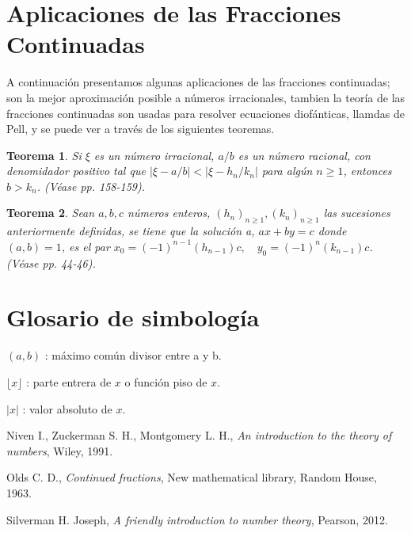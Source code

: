 \documentclass[11pt, article]{article}
\newtheorem{theorem}{Teorema} %
\begin{document}
    \section*{Aplicaciones de las Fracciones Continuadas}
     A continuación presentamos algunas aplicaciones de las fracciones continuadas; son la mejor aproximación posible a números irracionales, tambien la teoría de las fracciones continuadas son usadas para resolver ecuaciones diofánticas, llamdas de Pell, y se puede ver a través de los siguientes teoremas.
     
     \begin{theorem}
         Si $\xi$ es un número irracional, $a/b$ es un número racional, con denomidador positivo tal que $|\xi - a/b|<|\xi-h_n/k_n|$ para algún $n\geq 1$, entonces $b>k_n$. \textnormal{(Véase \cite{Niven} pp. 158-159)}.
     \end{theorem}
     
    \begin{theorem}
        Sean  $a,b,c$ números enteros, $(h_n)_{n\geq 1}, (k_n)_{n\geq 1}$ las sucesiones anteriormente definidas, se tiene que la solución a, $ax+by=c$ donde $(a,b)=1$, es el par $x_0 = (-1)^{n-1} (h_{n-1})c,\quad y_0=(-1)^n (k_{n-1})c$. \textnormal{(Véase \cite{Olds} pp. 44-46)}.

     
    \end{theorem} 
    
     \section*{Glosario de simbología}
     
     $(a,b)$ : máximo común divisor entre a y b.
     
     $\lfloor x \rfloor$ : parte entrera  de $x$ o función piso de $x$.
     
     $|x|$ : valor absoluto de $x$.
    \begin{comment}
        \section{Referencias}
    \end{comment}
     \begin{thebibliography}{9}
     
         Niven I., Zuckerman S. H., Montgomery L. H., \textit{An introduction to the theory of numbers}, Wiley, 1991.
    
         Olds C. D., \textit{Continued fractions}, New mathematical library, Random House, 1963.
     
         Silverman H. Joseph, \textit{A friendly introduction to number theory}, Pearson, 2012.
    \end{thebibliography}
\end{document}

